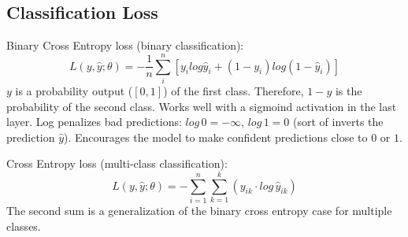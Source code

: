 \documentclass{scrartcl}
\begin{document}
\subsection*{Classification Loss}
Binary Cross Entropy loss (binary classification):
$$L(y, \hat{y}; \theta) = - \frac{1}{n} \sum_{i}^{n} [y_i log \hat{y}_i + (1 - y_i) log(1 - \hat{y}_i)] $$
$y$ is a probability output ($[0,1]$) of the first class. Therefore, $1 - y$ is the probability of the second class. Works well with a sigmoind activation in the last layer.
Log penalizes bad predictions: $log \, 0 = - \infty$, $log \, 1 = 0$ (sort of inverts the prediction $\hat{y}$).
Encourages the model to make confident predictions close to $0$ or $1$.

Cross Entropy loss (multi-class classification):
$$L(y, \hat{y}; \theta) = - \sum_{i=1}^{n} \sum_{k=1}^{k} (y_{ik} \cdot log \, \hat{y}_{ik})$$
The second sum is a generalization of the binary cross entropy case for multiple classes.
\end{document}
